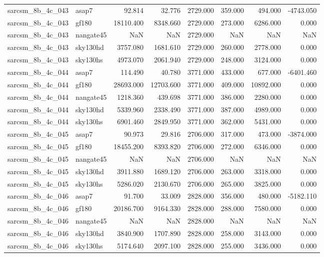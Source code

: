 \begin{tabular}{llrrrrrr}
sarcsm\_8b\_4c\_043 & asap7 & 92.814 & 32.776 & 2729.000 & 359.000 & 494.000 & -4743.050 \\
sarcsm\_8b\_4c\_043 & gf180 & 18110.400 & 8348.660 & 2729.000 & 273.000 & 6286.000 & 0.000 \\
sarcsm\_8b\_4c\_043 & nangate45 & NaN & NaN & 2729.000 & NaN & NaN & NaN \\
sarcsm\_8b\_4c\_043 & sky130hd & 3757.080 & 1681.610 & 2729.000 & 260.000 & 2778.000 & 0.000 \\
sarcsm\_8b\_4c\_043 & sky130hs & 4973.070 & 2061.940 & 2729.000 & 248.000 & 3124.000 & 0.000 \\
sarcsm\_8b\_4c\_044 & asap7 & 114.490 & 40.780 & 3771.000 & 433.000 & 677.000 & -6401.460 \\
sarcsm\_8b\_4c\_044 & gf180 & 28693.000 & 12703.600 & 3771.000 & 409.000 & 10892.000 & 0.000 \\
sarcsm\_8b\_4c\_044 & nangate45 & 1218.360 & 439.698 & 3771.000 & 386.000 & 2280.000 & 0.000 \\
sarcsm\_8b\_4c\_044 & sky130hd & 5339.960 & 2338.490 & 3771.000 & 387.000 & 4989.000 & 0.000 \\
sarcsm\_8b\_4c\_044 & sky130hs & 6901.460 & 2849.950 & 3771.000 & 362.000 & 5431.000 & 0.000 \\
sarcsm\_8b\_4c\_045 & asap7 & 90.973 & 29.816 & 2706.000 & 317.000 & 473.000 & -3874.000 \\
sarcsm\_8b\_4c\_045 & gf180 & 18455.200 & 8393.820 & 2706.000 & 272.000 & 6346.000 & 0.000 \\
sarcsm\_8b\_4c\_045 & nangate45 & NaN & NaN & 2706.000 & NaN & NaN & NaN \\
sarcsm\_8b\_4c\_045 & sky130hd & 3911.880 & 1689.120 & 2706.000 & 263.000 & 3318.000 & 0.000 \\
sarcsm\_8b\_4c\_045 & sky130hs & 5286.020 & 2130.670 & 2706.000 & 265.000 & 3825.000 & 0.000 \\
sarcsm\_8b\_4c\_046 & asap7 & 91.700 & 33.009 & 2828.000 & 356.000 & 480.000 & -5182.110 \\
sarcsm\_8b\_4c\_046 & gf180 & 20186.700 & 9164.330 & 2828.000 & 288.000 & 7580.000 & 0.000 \\
sarcsm\_8b\_4c\_046 & nangate45 & NaN & NaN & 2828.000 & NaN & NaN & NaN \\
sarcsm\_8b\_4c\_046 & sky130hd & 3840.900 & 1707.890 & 2828.000 & 258.000 & 3143.000 & 0.000 \\
sarcsm\_8b\_4c\_046 & sky130hs & 5174.640 & 2097.100 & 2828.000 & 255.000 & 3436.000 & 0.000 \\

\end{tabular}
